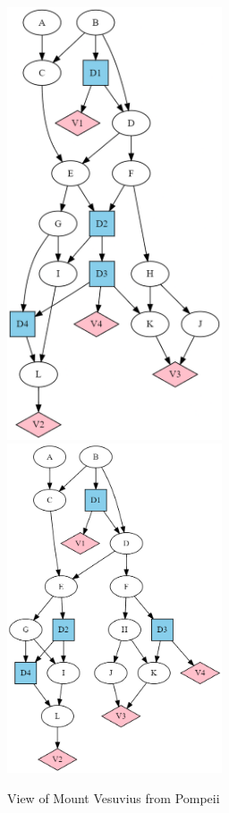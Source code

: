 \begin{itemize}
\begin{figure}[h!]
\centering
\includegraphics[width=2.5in]{influ-diag/sha-fig1.png}
\includegraphics[width=2.5in]{influ-diag/sha-fig3.png}
\caption{View of Mount Vesuvius from
  Pompeii}
\label{fig-sha-fig13}
\end{figure}



\end{itemize}
